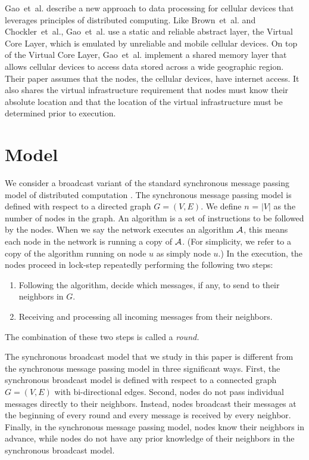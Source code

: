 \documentclass[english]{article}
\begin{document}
Gao~et~al. describe a new approach to data processing for cellular devices that leverages principles of distributed computing. Like Brown~et~al. and Chockler~et~al., Gao~et~al. use a static and reliable abstract layer, the Virtual Core Layer, which is emulated by unreliable and mobile cellular devices. On top of the Virtual Core Layer, Gao~et~al. implement a shared memory layer that allows cellular devices to access data stored across a wide geographic region. Their paper assumes that the nodes, the cellular devices, have internet access. It also shares the virtual infrastructure requirement that nodes must know their absolute location and that the location of the virtual infrastructure must be determined prior to execution.


\section{Model}


We consider a broadcast variant of the standard synchronous message passing model of distributed computation \cite{Lynch:1996, Kuhn:2010}. The synchronous message passing model is defined with respect to a directed graph $G=(V,E)$. We define $n$ = $|V|$ as the number of nodes in the graph. An algorithm is a set of instructions to be followed by the nodes. When we say the network executes an algorithm $\cal A$, this means each node in the network is running a copy of $\cal A$. (For simplicity, we refer to a copy of the algorithm running on node $u$ as simply node $u$.) In the execution, the nodes proceed in lock-step repeatedly performing the following two steps:
\begin{enumerate}
  \item Following the algorithm, decide which messages, if any, to send to their neighbors in $G$.
  \item Receiving and processing all incoming messages from their neighbors.
\end{enumerate}
The combination of these two steps is called a \em round\em.

The synchronous broadcast model that we study in this paper is different from the synchronous message passing model in three significant ways. First, the synchronous broadcast model is defined with respect to a connected graph $G=(V,E)$ with bi-directional edges. Second, nodes do not pass individual messages directly to their neighbors. Instead, nodes broadcast their messages at the beginning of every round and every message is received by every neighbor. Finally, in the synchronous message passing model, nodes know their neighbors in advance, while nodes do not have any prior knowledge of their neighbors in the synchronous broadcast model.
\end{document}
